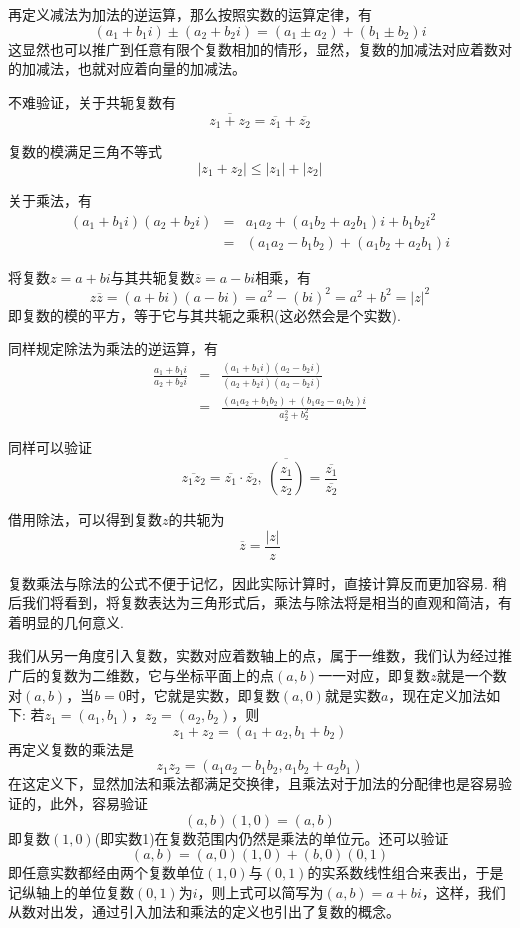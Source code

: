 再定义减法为加法的逆运算，那么按照实数的运算定律，有
\[ (a_1+b_1i) \pm (a_2+b_2i) = (a_1 \pm a_2) + (b_1 \pm b_2)i \]
这显然也可以推广到任意有限个复数相加的情形，显然，复数的加减法对应着数对的加减法，也就对应着向量的加减法。

不难验证，关于共轭复数有
\[ \overline{z_1+z_2}=\overline{z_1}+\overline{z_2} \]

复数的模满足三角不等式
\[ |z_1+z_2| \leqslant |z_1|+|z_2| \]

关于乘法，有
\begin{eqnarray*}
  (a_1+b_1i)(a_2+b_2i) & = & a_1a_2+(a_1b_2+a_2b_1)i + b_1b_2 i^2 \\
  & = & (a_1a_2-b_1b_2) + (a_1b_2+a_2b_1)i
\end{eqnarray*}

将复数$z=a+bi$与其共轭复数$\overline{z}=a-bi$相乘，有
\[ z\overline{z}=(a+bi)(a-bi)=a^2-(bi)^2=a^2+b^2 = |z|^2 \]
即复数的模的平方，等于它与其共轭之乘积(这必然会是个实数).

同样规定除法为乘法的逆运算，有
\begin{eqnarray*}
  \frac{a_1+b_1i}{a_2+b_2i} & = & \frac{(a_1+b_1i)(a_2-b_2i)}{(a_2+b_2i)(a_2-b_2i)} \\
  & = & \frac{(a_1a_2+b_1b_2)+(b_1a_2-a_1b_2)i}{a_2^2+b_2^2}
\end{eqnarray*}

同样可以验证
\[ \overline{z_1z_2} = \overline{z_1} \cdot \overline{z_2}, \  \overline{\left( \frac{z_1}{z_2} \right)} = \frac{\overline{z_1}}{\overline{z_2}} \]

借用除法，可以得到复数$z$的共轭为
\[ \overline{z}=\frac{|z|}{z} \]

复数乘法与除法的公式不便于记忆，因此实际计算时，直接计算反而更加容易. 稍后我们将看到，将复数表达为三角形式后，乘法与除法将是相当的直观和简洁，有着明显的几何意义.

\begin{example}[从数对引入复数]
  我们从另一角度引入复数，实数对应着数轴上的点，属于一维数，我们认为经过推广后的复数为二维数，它与坐标平面上的点$(a,b)$一一对应，即复数$z$就是一个数对$(a,b)$，当$b=0$时，它就是实数，即复数$(a,0)$就是实数$a$，现在定义加法如下: 若$z_1=(a_1,b_1)$，$z_2=(a_2,b_2)$，则
  \[ z_1 + z_2 = (a_1 + a_2, b_1 + b_2) \]
  再定义复数的乘法是
  \[ z_1z_2 = (a_1a_2-b_1b_2,a_1b_2+a_2b_1) \]
  在这定义下，显然加法和乘法都满足交换律，且乘法对于加法的分配律也是容易验证的，此外，容易验证
  \[ (a,b)(1,0) = (a,b) \]
  即复数$(1,0)$(即实数1)在复数范围内仍然是乘法的单位元。还可以验证
  \[ (a,b) = (a,0)(1,0) + (b,0)(0,1)  \]
  即任意实数都经由两个复数单位$(1,0)$与$(0,1)$的实系数线性组合来表出，于是记纵轴上的单位复数$(0,1)$为$i$，则上式可以简写为$(a,b)=a+bi$，这样，我们从数对出发，通过引入加法和乘法的定义也引出了复数的概念。
\end{example}

